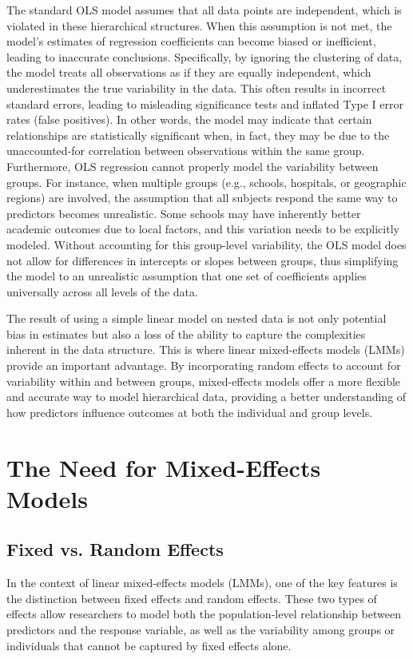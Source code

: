 The standard OLS model assumes that all data points are independent, which is violated in these hierarchical structures. When this assumption is not met, the model's estimates of regression coefficients can become biased or inefficient, leading to inaccurate conclusions. Specifically, by ignoring the clustering of data, the model treats all observations as if they are equally independent, which underestimates the true variability in the data. This often results in incorrect standard errors, leading to misleading significance tests and inflated Type I error rates (false positives). In other words, the model may indicate that certain relationships are statistically significant when, in fact, they may be due to the unaccounted-for correlation between observations within the same group.
Furthermore, OLS regression cannot properly model the variability between groups. For instance, when multiple groups (e.g., schools, hospitals, or geographic regions) are involved, the assumption that all subjects respond the same way to predictors becomes unrealistic. Some schools may have inherently better academic outcomes due to local factors, and this variation needs to be explicitly modeled. Without accounting for this group-level variability, the OLS model does not allow for differences in intercepts or slopes between groups, thus simplifying the model to an unrealistic assumption that one set of coefficients applies universally across all levels of the data.

The result of using a simple linear model on nested data is not only potential bias in estimates but also a loss of the ability to capture the complexities inherent in the data structure. This is where linear mixed-effects models (LMMs) provide an important advantage. By incorporating random effects to account for variability within and between groups, mixed-effects models offer a more flexible and accurate way to model hierarchical data, providing a better understanding of how predictors influence outcomes at both the individual and group levels.

\section{The Need for Mixed-Effects Models}
\subsection*{Fixed vs. Random Effects}
In the context of linear mixed-effects models (LMMs), one of the key features is the distinction between fixed effects and random effects. These two types of effects allow researchers to model both the population-level relationship between predictors and the response variable, as well as the variability among groups or individuals that cannot be captured by fixed effects alone.

